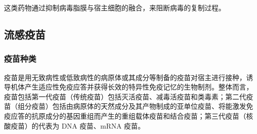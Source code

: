 \documentclass[9pt,a4paper,twoside]{rho-class/rho}
\begin{document}
    这类药物通过抑制病毒脂膜与宿主细胞的融合，来阻断病毒的复制过程。

\subsection{流感疫苗}

    \subsubsection{疫苗种类}

    疫苗是用无致病性或低致病性的病原体或其成分等制备的疫苗对宿主进行接种，诱导机体产生适应性免疫应答并获得长效的特异性免疫记忆的生物制剂。整体而言，疫苗包括第一代疫苗（传统疫苗）包括灭活疫苗、减毒活疫苗和类毒素；第二代疫苗（组分疫苗）包括由病原体的天然成分及其产物制成的亚单位疫苗、将能激发免疫应答的抗原成分的基因重组而产生的重组载体疫苗和结合疫苗；第三代疫苗（核酸疫苗）的代表为 DNA 疫苗、mRNA 疫苗。
\end{document}
